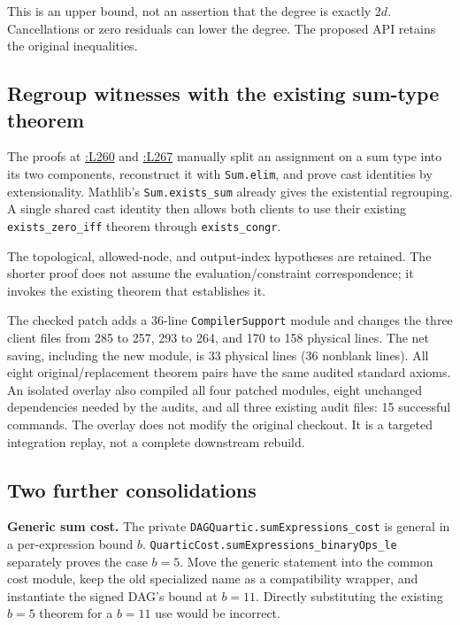 \documentclass[11pt,letterpaper]{article}
\newcommand{\src}[2]{\href{https://github.com/VladimirReshetnikov/ProveIt/blob/60e9c5d620c6c387d932876cfa2d9376f64ea56c/Computability/DiophantineConsistency/Lean/DiophantineConsistency/#1.lean\#L#2}{\texttt{\detokenize{#1}}:L#2}}
\begin{document}
This is an upper bound, not an assertion that the degree is exactly $2d$.
Cancellations or zero residuals can lower the degree. The proposed API
retains the original inequalities.

\subsection{Regroup witnesses with the existing sum-type theorem}

The proofs at \src{DAGQuartic}{260} and \src{NaturalDAGQuartic}{267}
manually split an assignment on a sum type into its two components,
reconstruct it with \texttt{Sum.elim}, and prove cast identities by
extensionality. Mathlib's \texttt{Sum.exists\_sum} already gives the
existential regrouping. A single shared cast identity then allows both
clients to use their existing \texttt{exists\_zero\_iff} theorem through
\texttt{exists\_congr}.

The topological, allowed-node, and output-index hypotheses are retained.
The shorter proof does not assume the evaluation/constraint correspondence;
it invokes the existing theorem that establishes it.

The checked patch adds a 36-line \texttt{CompilerSupport} module and changes the three client files from 285 to 257, 293 to 264, and 170 to 158 physical lines. The net saving, including the new module, is 33 physical lines (36 nonblank lines). All eight original/replacement theorem pairs have the same audited standard axioms. An isolated overlay also compiled all four patched modules, eight unchanged dependencies needed by the audits, and all three existing audit files: 15 successful commands. The overlay does not modify the original checkout. It is a targeted integration replay, not a complete downstream rebuild.

\subsection{Two further consolidations}

\textbf{Generic sum cost.} The private
\texttt{DAGQuartic.sumExpressions\_cost} is general in a per-expression
bound $b$. \texttt{QuarticCost.sumExpressions\_binaryOps\_le} separately
proves the case $b=5$. Move the generic statement into the common cost
module, keep the old specialized name as a compatibility wrapper, and
instantiate the signed DAG's bound at $b=11$. Directly substituting the
existing $b=5$ theorem for a $b=11$ use would be incorrect.
\end{document}
